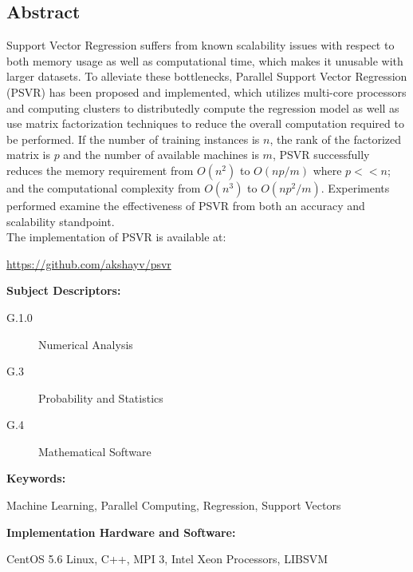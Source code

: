 \documentclass[12pt]{article}
\begin{document}
\begin{center}
\section*{Abstract}
%
\end{center}
\begin{adjustwidth}{2 cm}{2 cm} 
Support Vector Regression suffers from known scalability issues with respect to both memory usage as well as computational time, which makes it unusable with larger datasets. To alleviate these bottlenecks, Parallel Support Vector Regression (PSVR) has been proposed and implemented, which utilizes multi-core processors and computing clusters to distributedly compute the regression model as well as use matrix factorization techniques to reduce the overall computation required to be performed. If the number of training instances is $n$, the rank of the factorized matrix is $p$ and the number of available machines is $m$, PSVR successfully reduces the memory requirement from $O(n^2)$ to $O(np/m)$ where $p << n$; and the computational complexity from $O(n^3)$ to $O(np^2/m)$. Experiments performed examine the effectiveness of PSVR from both an accuracy and scalability standpoint.\\
The implementation of PSVR is available at:
\begin{center}
 \url{https://github.com/akshayv/psvr}
 \end{center}
\end{adjustwidth}
\vspace{1 cm} 

\begin{adjustwidth}{0 cm}{0 cm}
{\bf Subject Descriptors:} 
\end{adjustwidth}
\begin{adjustwidth}{2 cm}{2 cm}
\begin{description}
\item[G.1.0]	 Numerical Analysis
\item[G.3]    Probability and Statistics
\item[G.4] Mathematical Software
\end{description}
\end{adjustwidth}
{\bf Keywords:} 
\begin{adjustwidth}{2 cm}{2 cm}
Machine Learning, Parallel Computing, Regression, Support Vectors\\
\end{adjustwidth} 
{\bf Implementation Hardware and Software:}
\begin{adjustwidth}{2 cm}{2 cm}
CentOS 5.6 Linux, C++, MPI 3, Intel Xeon Processors, LIBSVM
\end{adjustwidth} 
\newpage
\end{document}
